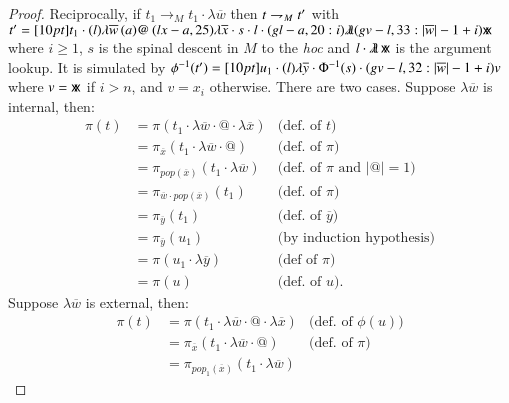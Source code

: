\documentclass{elsarticle}
\newif\iflongversion
\theoremstyle{plain}
\theoremstyle{definition}
\newcommand{\ghostlmd}{{\lambda\mkern-7mu \lambda}}
\newcommand{\ghostvar}{\mathsf{x\mkern-5mu x}}
\def\coresymbol{\pi} %
\begin{document}
\begin{proof}
Reciprocally,
if $t_1 \rightarrow_M t_1 \cdot \lambda\overline{w}$
then $t \rightharpoondown_M t'$
with
$t' = \Pstr[10pt]{t_1 \cdot
    (l){\lambda\overline{w}} \, (a)@ \, (lx-a,25){\lambda\overline{x}} \cdot s \cdot l \cdot (gl-a,20:i)\ghostlmd  (gv-l,33:{|\overline{w}|-1+i})\ghostvar }
$ where
$i\geq1$,
$s$ is the spinal descent in $M$ to the \emph{hoc}
and $l \cdot \ghostlmd\, \ghostvar$ is the argument lookup.
It is simulated by
$\phi^{-1}(t') = \Pstr[10pt]{u_1 \cdot
    (l){\lambda\overline y} \cdot {\Phi^{-1}(s)} \cdot (gv-l,32:{|\overline{w}|-1+i}) v }
$
where $v = \ghostvar$ if $i>n$, and
$v = x_i$ otherwise.
%
\iflongversion
    There are two cases. Suppose $\lambda\overline{w}$ is internal, then:
    \begin{align*}
        \coresymbol(t)
        &=  \coresymbol(t_1 \cdot \lambda\overline{w} \cdot @ \cdot \lambda\overline{x})
            & \mbox{(def.~of $t$)}
        \\
        &=  \coresymbol_{\overline{x}}(t_1 \cdot
        \lambda\overline{w} \cdot @)
            & \mbox{(def.~of $\coresymbol$)}
        \\
        &=  \coresymbol_{pop(\overline{x})}(t_1 \cdot
        \lambda\overline{w})
            & \mbox{(def.~of $\coresymbol$ and $|@|=1$)}
        \\
        &=  \coresymbol_{\overline{w} \cdot pop(\overline{x})}(t_1)
            & \mbox{(def.~of $\coresymbol$)}
        \\
        &=  \coresymbol_{\overline{y}}(t_1)
            & \mbox{(def.~of $\overline{y}$)}
        \\
        &=  \coresymbol_{\overline{y}}(u_1)
            & \mbox{(by induction hypothesis)}
        \\
        &= \coresymbol(u_1 \cdot \lambda\overline{y}) & \mbox{(def of $\coresymbol$)} \\
        &=  \coresymbol(u)
            & \mbox{(def.~of $u$).}
    \end{align*}
    Suppose $\lambda\overline{w}$ is external, then:
    \begin{align*}
        \coresymbol(t)
        &=  \coresymbol(t_1 \cdot \lambda\overline{w} \cdot @ \cdot \lambda\overline{x})
            & \mbox{(def.~of $\phi(u)$)}
        \\
        &=  \coresymbol_{\overline{x}}(t_1 \cdot
        \lambda\overline{w} \cdot @)
            & \mbox{(def.~of $\coresymbol$)}
        \\
        &=  \coresymbol_{pop_1(\overline{x})}(t_1 \cdot \lambda\overline{w})

\end{align*}
\end{proof}
\end{document}
